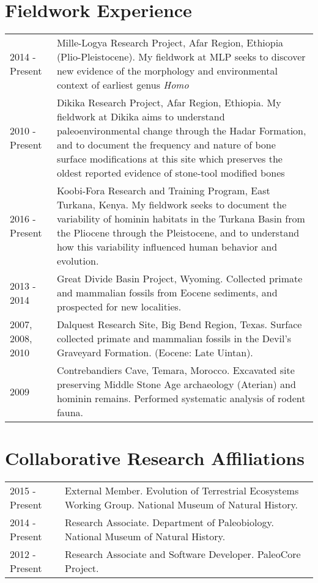 \documentclass{article}
\begin{document}
\section*{Fieldwork Experience}
\begin{longtable}{p{}p{}}
2014 - Present & Mille-Logya Research Project, Afar Region, Ethiopia (Plio-Pleistocene). My fieldwork at MLP seeks to discover new evidence of the morphology and environmental context of earliest genus \emph{Homo}  \\[4pt]

2010 - Present & Dikika Research Project, Afar Region, Ethiopia. My fieldwork at Dikika aims to understand paleoenvironmental change through the Hadar Formation, and to document the frequency and nature of bone surface modifications at this site which preserves the oldest reported evidence of stone-tool modified bones \\[4pt]

2016 - Present & Koobi-Fora Research and Training Program, East Turkana, Kenya. My fieldwork seeks to document the variability of hominin habitats in the Turkana Basin from the Pliocene through the Pleistocene, and to understand how this variability influenced human behavior and evolution. \\[4pt]

2013 - 2014 & Great Divide Basin Project, Wyoming. Collected primate and mammalian fossils from Eocene sediments, and prospected for new localities. \\[4pt]

2007, 2008, 2010 & Dalquest Research Site, Big Bend Region, Texas. Surface collected primate and mammalian fossils in the Devil's Graveyard Formation. (Eocene: Late Uintan).\\[4pt]

2009 & Contrebandiers Cave, Temara, Morocco.  Excavated site preserving Middle Stone Age archaeology (Aterian) and hominin remains. Performed systematic analysis of rodent fauna.\\
\end{longtable}

\section*{Collaborative Research Affiliations}
\begin{tabular}{p{}p{}}

2015 - Present & External Member. Evolution of Terrestrial Ecosystems Working Group. National Museum of Natural History.\\[4pt]
2014 - Present & Research Associate. Department of Paleobiology.  National Museum of Natural History.\\[4pt]
2012 - Present & Research Associate and Software Developer. PaleoCore Project.\\

\end{tabular}
\end{document}
